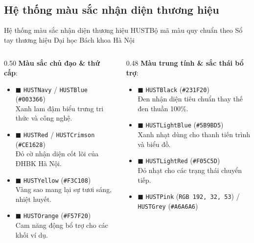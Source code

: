 \documentclass[aspectratio=169,10pt]{beamer}
\begin{document}
\subsection{Hệ thống màu sắc nhận diện thương hiệu}
\begin{frame}{Hệ thống màu sắc nhận diện thương hiệu HUST}{Bộ mã màu quy chuẩn theo Sổ tay thương hiệu Đại học Bách khoa Hà Nội}
  \begin{columns}[T]
    \begin{column}{0.50\textwidth}
      \textbf{Màu sắc chủ đạo \& thứ cấp}:
      \begin{itemize}\setlength{\itemsep}{3pt}
        \item \textcolor{HUSTNavy}{$\blacksquare$ \texttt{HUSTNavy} / \texttt{HUSTBlue}} (\texttt{\#003366})\\
          \scriptsize Xanh lam đậm biểu trưng tri thức và công nghệ.
        \item \textcolor{HUSTRed}{$\blacksquare$ \texttt{HUSTRed} / \texttt{HUSTCrimson}} (\texttt{\#CE1628})\\
          \scriptsize Đỏ cờ nhận diện cốt lõi của ĐHBK Hà Nội.
        \item \textcolor{HUSTYellow}{$\blacksquare$ \texttt{HUSTYellow}} (\texttt{\#F3C108})\\
          \scriptsize Vàng sao mang lại sự tươi sáng, nhiệt huyết.
        \item \textcolor{HUSTOrange}{$\blacksquare$ \texttt{HUSTOrange}} (\texttt{\#F57F20})\\
          \scriptsize Cam năng động bổ trợ cho các khối ví dụ.
      \end{itemize}
    \end{column}

    \begin{column}{0.48\textwidth}
      \textbf{Màu trung tính \& sắc thái bổ trợ}:
      \begin{itemize}\setlength{\itemsep}{3pt}
        \item \textcolor{HUSTBlack}{$\blacksquare$ \texttt{HUSTBlack}} (\texttt{\#231F20})\\
          \scriptsize Đen nhận diện tiêu chuẩn thay thế đen thuần 100\%.
        \item \textcolor{HUSTLightBlue}{$\blacksquare$ \texttt{HUSTLightBlue}} (\texttt{\#5B9BD5})\\
          \scriptsize Xanh nhạt dùng cho thanh tiến trình và biểu đồ.
        \item \textcolor{HUSTLightRed}{$\blacksquare$ \texttt{HUSTLightRed}} (\texttt{\#F05C5D})\\
          \scriptsize Đỏ nhạt cho các trạng thái chuyển tiếp.
        \item \textcolor{HUSTPink}{$\blacksquare$ \texttt{HUSTPink}} (\texttt{RGB 192, 32, 53}) / \textcolor{HUSTGrey}{\texttt{HUSTGrey}} (\texttt{\#A6A6A6})
      \end{itemize}
    \end{column}
  \end{columns}
\end{frame}
\end{document}
